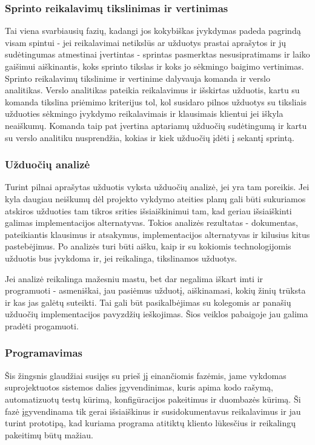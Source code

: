 \documentclass{VUMIFPSkursinis}
\begin{document}
	\subsubsection{Sprinto reikalavimų tikslinimas ir vertinimas}
	Tai viena svarbiausių fazių, kadangi jos kokybiškas įvykdymas padeda pagrindą visam spintui -  jei reikalavimai netikslūs ar užduotys prastai aprašytos ir jų sudėtingumas atmestinai įvertintas - sprintas pasmerktas nesusipratimams ir laiko gaišimui aiškinantis, koks sprinto tikslas ir koks jo sėkmingo baigimo vertinimas. Sprinto reikalavimų tikslinime ir vertinime dalyvauja komanda ir verslo analitikas. Verslo analitikas pateikia reikalavimus ir išskirtas užduotis, kartu su komanda tikslina priėmimo kriterijus tol, kol susidaro pilnos užduotys su tiksliais užduoties sėkmingo įvykdymo reikalavimais ir klausimais klientui jei iškyla neaiškumų. Komanda taip pat įvertina aptariamų užduočių sudėtingumą ir kartu su verslo analitiku nusprendžia, kokias ir kiek užduočių įdėti į sekantį sprintą.
	\subsubsection{Užduočių analizė}
	Turint pilnai aprašytas užduotis vyksta užduočių analizė, jei yra tam poreikis. Jei kyla daugiau neiškumų dėl projekto vykdymo ateities planų gali būti sukuriamos atskiros užduoties tam tikros srities išsiaiškinimui tam, kad geriau išsiaiškinti galimas implementacijos alternatyvas. Tokios analizės rezultatas - dokumentas, pateikiantis klausimus ir atsakymus, implementacijos alternatyvas ir kilusius kitus pastebėjimus. Po analizės turi būti aišku, kaip ir su kokiomis technologijomis užduotis bus įvykdoma ir, jei reikalinga, tikslinamos užduotys. 
	\par Jei analizė reikalinga mažesniu mastu, bet dar negalima iškart imti ir programuoti - asmeniškai, jau pasiėmus užduotį, aiškinamasi, kokių žinių trūksta ir kas jas galėtų suteikti. Tai gali būt pasikalbėjimas su kolegomis ar panašių užduočių implementacijos pavyzdžių ieškojimas. Šios veiklos pabaigoje jau galima pradėti progamuoti.
	\subsubsection{Programavimas}
	Šis žingsnis glaudžiai susijęs su prieš jį einančiomis fazėmis, jame vykdomas suprojektuotos sistemos dalies įgyvendinimas, kuris apima kodo rašymą, automatizuotų testų kūrimą, konfigūracijos pakeitimus ir duombazės kūrimą. Ši fazė įgyvendinama tik gerai išsiaiškinus ir susidokumentavus reikalavimus ir jau turint prototipą, kad kuriama programa atitiktų kliento lūkesčius ir reikalingų pakeitimų būtų mažiau.
\end{document}
